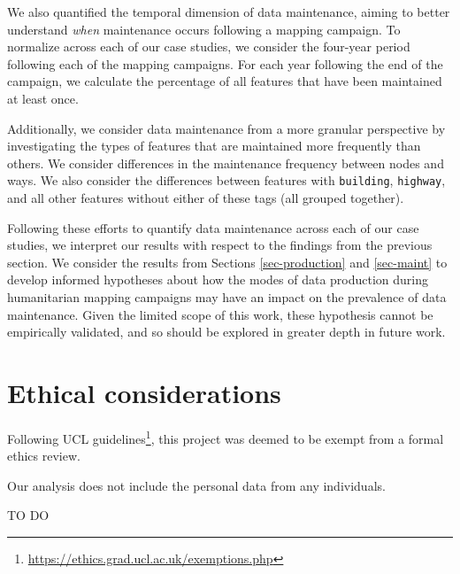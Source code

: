We also quantified the temporal dimension of data maintenance, aiming to better understand \textit{when} maintenance occurs following a mapping campaign. To normalize across each of our case studies, we consider the four-year period following each of the mapping campaigns. For each year following the end of the campaign, we calculate the percentage of all features that have been maintained at least once. 

Additionally, we consider data maintenance from a more granular perspective by investigating the types of features that are maintained more frequently than others. We consider differences in the maintenance frequency between nodes and ways. We also consider the differences between features with \texttt{building}, \texttt{highway}, and all other features without either of these tags (all grouped together). 

Following these efforts to quantify data maintenance across each of our case studies, we interpret our results with respect to the findings from the previous section. We consider the results from Sections \ref{sec-production} and \ref{sec-maint} to develop informed hypotheses about how the modes of data production during humanitarian mapping campaigns may have an impact on the prevalence of data maintenance. Given the limited scope of this work, these hypothesis cannot be empirically validated, and so should be explored in greater depth in future work. 

\section{Ethical considerations}

Following UCL guidelines\footnote{\url{https://ethics.grad.ucl.ac.uk/exemptions.php}}, this project was deemed to be exempt from a formal ethics review.  

Our analysis does not include the personal data from any individuals. 

TO DO

